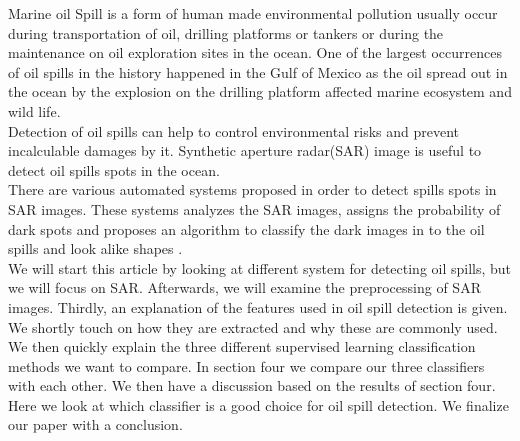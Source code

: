 Marine oil Spill is a form of human made environmental pollution usually occur during transportation of oil, drilling platforms or tankers \cite{Zhang201476}or during the maintenance on oil exploration sites in the ocean. One of the largest occurrences of oil spills in the history happened in the Gulf of Mexico as the oil spread out in the ocean by the explosion on the drilling platform affected marine ecosystem and wild life\cite{Bozeman2011244}.\\
Detection of oil spills can help to control environmental risks and prevent incalculable damages by it. Synthetic aperture radar(SAR) image is useful to detect oil spills spots in the ocean. \\
There are various automated systems proposed in order to detect spills spots in SAR images. These systems analyzes the SAR images, assigns the probability of dark spots and proposes an algorithm to classify the dark images in to the oil spills and look alike shapes \cite{Xu201414,brekke2008classifiers,Keramitsoglou2006640,Guo2014146}.\\
We will start this article by looking at different system for detecting oil spills, but we will focus on SAR. Afterwards, we will examine the preprocessing of SAR images. Thirdly, an explanation of the features used in oil spill detection is given. We shortly touch on how they are extracted and why these are commonly used. We then quickly explain the three different supervised learning classification methods we want to compare. In section four we compare our three classifiers with each other. We then have a discussion based on the results of section four. Here we look at which classifier is a good choice for oil spill detection. We finalize our paper with a conclusion.